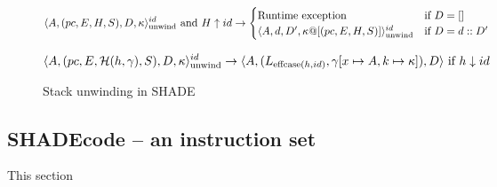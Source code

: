 \documentclass[class=article, crop=false]{standalone}
\begin{document}
\begin{figure}
    $$ \langle A, (pc, E, H, S), D, \kappa  \rangle_\text{unwind}^{id} \text{ and } H \uparrow id \to \begin{cases}
        \text{Runtime exception} & \text{if } D = [] \\
    \langle A, d, D', \kappa @ [(pc, E, H, S)] \rangle_\text{unwind}^{id} & \text{if } D = d :: D' \end{cases} $$

    $$ \langle A, (pc, E, \mathcal{H}(h, \gamma), S), D, \kappa \rangle_\text{unwind}^{id} \to
        \langle A, (L_{\text{effcase}(h, id)}, \gamma[x \mapsto A, k \mapsto \kappa] ), D \rangle \text{ if } h \downarrow id $$
    \caption{Stack unwinding in SHADE}
    \label{fig:shade-stack-unwind}
\end{figure}


\subsection{SHADEcode -- an instruction set}

This section
\end{document}
